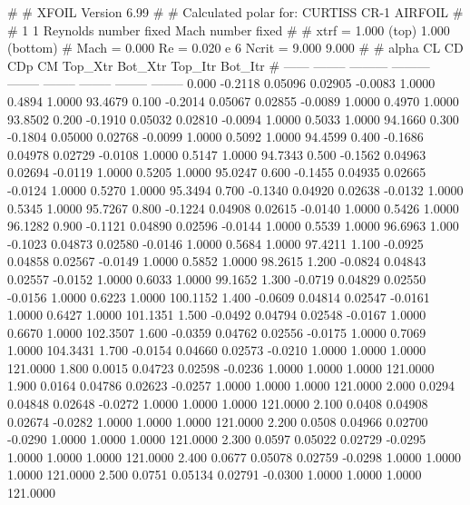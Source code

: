 #  
#       XFOIL         Version 6.99
#  
# Calculated polar for: CURTISS CR-1 AIRFOIL                            
#  
# 1 1 Reynolds number fixed          Mach number fixed         
#  
# xtrf =   1.000 (top)        1.000 (bottom)  
# Mach =   0.000     Re =     0.020 e 6     Ncrit =   9.000  9.000
#  
#   alpha    CL        CD       CDp       CM     Top_Xtr  Bot_Xtr  Top_Itr  Bot_Itr
#  ------ -------- --------- --------- -------- -------- -------- -------- --------
   0.000  -0.2118   0.05096   0.02905  -0.0083   1.0000   0.4894   1.0000  93.4679
   0.100  -0.2014   0.05067   0.02855  -0.0089   1.0000   0.4970   1.0000  93.8502
   0.200  -0.1910   0.05032   0.02810  -0.0094   1.0000   0.5033   1.0000  94.1660
   0.300  -0.1804   0.05000   0.02768  -0.0099   1.0000   0.5092   1.0000  94.4599
   0.400  -0.1686   0.04978   0.02729  -0.0108   1.0000   0.5147   1.0000  94.7343
   0.500  -0.1562   0.04963   0.02694  -0.0119   1.0000   0.5205   1.0000  95.0247
   0.600  -0.1455   0.04935   0.02665  -0.0124   1.0000   0.5270   1.0000  95.3494
   0.700  -0.1340   0.04920   0.02638  -0.0132   1.0000   0.5345   1.0000  95.7267
   0.800  -0.1224   0.04908   0.02615  -0.0140   1.0000   0.5426   1.0000  96.1282
   0.900  -0.1121   0.04890   0.02596  -0.0144   1.0000   0.5539   1.0000  96.6963
   1.000  -0.1023   0.04873   0.02580  -0.0146   1.0000   0.5684   1.0000  97.4211
   1.100  -0.0925   0.04858   0.02567  -0.0149   1.0000   0.5852   1.0000  98.2615
   1.200  -0.0824   0.04843   0.02557  -0.0152   1.0000   0.6033   1.0000  99.1652
   1.300  -0.0719   0.04829   0.02550  -0.0156   1.0000   0.6223   1.0000 100.1152
   1.400  -0.0609   0.04814   0.02547  -0.0161   1.0000   0.6427   1.0000 101.1351
   1.500  -0.0492   0.04794   0.02548  -0.0167   1.0000   0.6670   1.0000 102.3507
   1.600  -0.0359   0.04762   0.02556  -0.0175   1.0000   0.7069   1.0000 104.3431
   1.700  -0.0154   0.04660   0.02573  -0.0210   1.0000   1.0000   1.0000 121.0000
   1.800   0.0015   0.04723   0.02598  -0.0236   1.0000   1.0000   1.0000 121.0000
   1.900   0.0164   0.04786   0.02623  -0.0257   1.0000   1.0000   1.0000 121.0000
   2.000   0.0294   0.04848   0.02648  -0.0272   1.0000   1.0000   1.0000 121.0000
   2.100   0.0408   0.04908   0.02674  -0.0282   1.0000   1.0000   1.0000 121.0000
   2.200   0.0508   0.04966   0.02700  -0.0290   1.0000   1.0000   1.0000 121.0000
   2.300   0.0597   0.05022   0.02729  -0.0295   1.0000   1.0000   1.0000 121.0000
   2.400   0.0677   0.05078   0.02759  -0.0298   1.0000   1.0000   1.0000 121.0000
   2.500   0.0751   0.05134   0.02791  -0.0300   1.0000   1.0000   1.0000 121.0000

